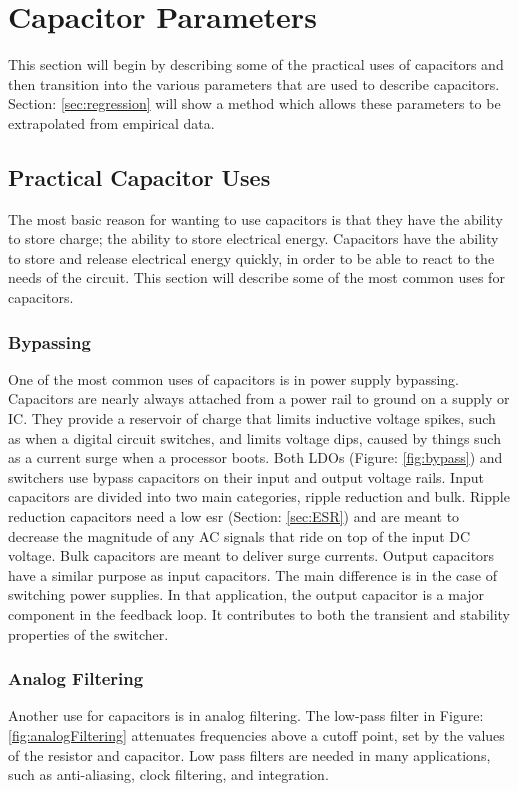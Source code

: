 \section {Capacitor Parameters}
This section will begin by describing some of the practical uses of capacitors and then transition into the various parameters that are used to describe capacitors. Section: \ref{sec:regression} will show a method which allows these parameters to be extrapolated from empirical data.

\subsection{Practical Capacitor Uses}

The most basic reason for wanting to use capacitors is that they  have the ability to store charge; the ability to store electrical energy. Capacitors have the ability to store and release electrical energy quickly, in order to be able to react to the needs of the circuit. This section will describe some of the most common uses for capacitors.

\subsubsection{Bypassing}


One of the most common uses of capacitors is in power supply bypassing. Capacitors are nearly always attached from a power rail to ground on a supply or IC. They provide a reservoir of charge that limits inductive voltage spikes, such as when a digital circuit switches, and limits voltage dips, caused by things such as a current surge when a processor boots.
Both LDOs (Figure: \ref{fig:bypass}) and switchers use bypass capacitors on their input and output voltage rails. Input capacitors are divided into two main categories, ripple reduction and bulk. Ripple reduction capacitors need a low \gls{esr} (Section: \ref{sec:ESR}) and are meant to decrease the magnitude of any AC signals that ride on top of the input DC voltage. Bulk capacitors are meant to deliver surge currents. Output capacitors have a similar purpose as input capacitors. The main difference is in the case of switching power supplies. In that application, the output capacitor is a major component in the feedback loop. It contributes to both the transient and stability properties of the switcher.

\subsubsection{Analog Filtering}

Another use for capacitors is in analog filtering. The low-pass filter in Figure: \ref{fig:analogFiltering} attenuates frequencies above a cutoff point, set by the values of the resistor and capacitor. Low pass filters are needed in many applications, such as anti-aliasing, clock filtering, and integration.

